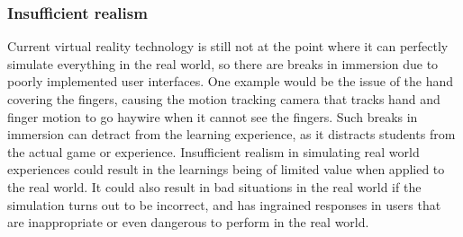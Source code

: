 \documentclass[11pt]{article}
\begin{document}
\subsubsection{Insufficient realism}
\label{sec:org8862ca4}
Current virtual reality technology is still not at the point where it can perfectly simulate everything in the real world, so there are breaks in immersion due to poorly implemented user interfaces. One example would be the issue of the hand covering the fingers, causing the motion tracking camera that tracks hand and finger motion to go haywire when it cannot see the fingers. Such breaks in immersion can detract from the learning experience, as it distracts students from the actual game or experience. Insufficient realism in simulating real world experiences could result in the learnings being of limited value when applied to the real world. It could also result in bad situations in the real world if the simulation turns out to be incorrect, and has ingrained responses in users that are inappropriate or even dangerous to perform in the real world.

 \newpage
\end{document}
